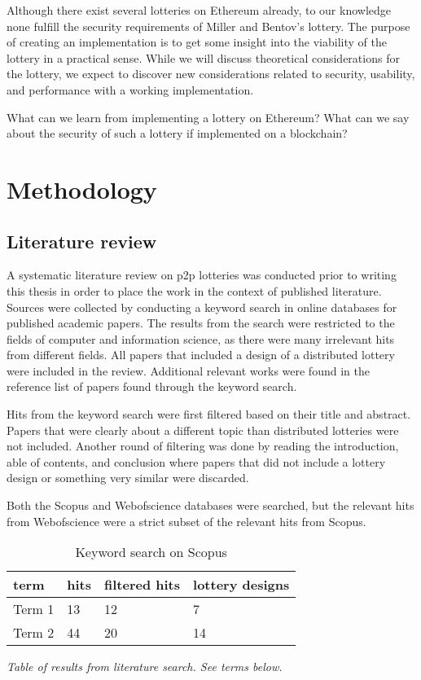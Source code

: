 Although there exist several lotteries on Ethereum already, to our knowledge none fulfill the security requirements of Miller and Bentov's lottery. The purpose of creating an implementation is to get some insight into the viability of the lottery in a practical sense. While we will discuss theoretical considerations for the lottery, we expect to discover new considerations related to security, usability, and performance with a working implementation. 

What can we learn from implementing a lottery on Ethereum? What can we say about the security of such a lottery if implemented on a blockchain?

\section{Methodology}
\label{sec:methodology}

\subsection{Literature review}

A systematic literature review on p2p lotteries was conducted prior to writing this thesis in order to place the work in the context of published literature. Sources were collected by conducting a keyword search in online databases for published academic papers. The results from the search were restricted to the fields of computer and information science, as there were many irrelevant hits from different fields. All papers that included a design of a distributed lottery were included in the review. Additional relevant works were found in the reference list of papers found through the keyword search. 

Hits from the keyword search were first filtered based on their title and abstract. Papers that were clearly about a different topic than distributed lotteries were not included. Another round of filtering was done by reading the introduction, able of contents, and conclusion where papers that did not include a lottery design or something very similar were discarded. 

Both the Scopus and Webofscience databases were searched, but the relevant hits from Webofscience were a strict subset of the relevant hits from Scopus.

\begin{table}[h]
\centering
\caption{Keyword search on Scopus}
\begin{tabular}{|l|l|l|l|}
\hline

term & hits & filtered hits & lottery designs \\ \hline
Term 1 & 13 & 12 & 7 \\ \hline
Term 2 & 44 & 20 & 14 \\ \hline

\end{tabular}
\end{table}
\emph{Table of results from literature search. See terms below.}

